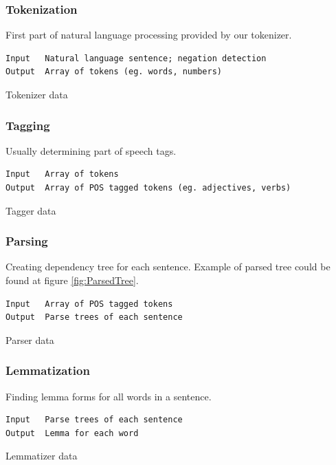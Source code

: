 \subsubsection{Tokenization}
First part of natural language processing provided by our tokenizer.
\begin{table}[ht]   %
\begin{center}
    \begin{verbatim}
Input 	Natural language sentence; negation detection
Output 	Array of tokens (eg. words, numbers) 
        \end{verbatim}
  \caption{Tokenizer data}
  \label{tab.tokenization}
\end{center}
\end{table} 

\subsubsection{Tagging}
Usually determining part of speech tags.
\begin{table}[ht]   %
\begin{center}
    \begin{verbatim}
Input 	Array of tokens
Output 	Array of POS tagged tokens (eg. adjectives, verbs) 
        \end{verbatim}
  \caption{Tagger data}
  \label{tab.tagging}
\end{center}
\end{table} 

\subsubsection{Parsing}
Creating dependency tree for each sentence. Example of parsed tree could be found at figure \ref{fig:ParsedTree}. 

\begin{table}[ht]   %
\begin{center}
    \begin{verbatim}
Input 	Array of POS tagged tokens
Output 	Parse trees of each sentence 
        \end{verbatim}
  \caption{Parser data}
  \label{tab.parsing}
\end{center}
\end{table}  

\subsubsection{Lemmatization}
Finding lemma forms for all words in a sentence.
\begin{table}[ht]   %
\begin{center}
    \begin{verbatim}
Input 	Parse trees of each sentence
Output 	Lemma for each word 
        \end{verbatim}
  \caption{Lemmatizer data}
  \label{tab.parsing}
\end{center}
\end{table} 

